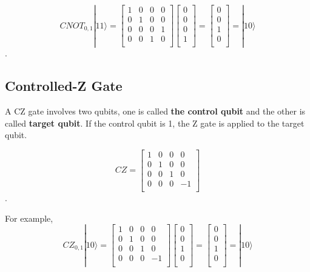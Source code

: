 \begin{equation}
CNOT_{0,1}|11\rangle = 
\begin{bmatrix}
1 & 0 & 0 & 0 \\
0 & 1 & 0 & 0 \\
0 & 0 & 0 & 1 \\
0 & 0 & 1 & 0 \\
\end{bmatrix}
 \left[
\begin{array}{c}
0 \\
0 \\
0 \\
1 \\
\end{array}
\right]
=  \left[
\begin{array}{c}
0 \\
0 \\
1 \\
0 \\
\end{array}
\right] 
= |10\rangle 
\end{equation}.

\subsection{Controlled-Z Gate}
A CZ gate involves two qubits, one is called \textbf{the control qubit} and the other is called \textbf{target qubit}.  If the control qubit is 1, the Z gate is applied to the target qubit.

\begin{equation}
CZ = \begin{bmatrix}
1 & 0 & 0 & 0 \\
0 & 1 & 0 & 0 \\
0 & 0 & 1 & 0 \\
0 & 0 & 0 & -1 \\
\end{bmatrix}
\end{equation}.

For example,
\begin{equation}
CZ_{0,1}|10\rangle = 
\begin{bmatrix}
1 & 0 & 0 & 0 \\
0 & 1 & 0 & 0 \\
0 & 0 & 1 & 0 \\
0 & 0 & 0 & -1 \\
\end{bmatrix}
 \left[
\begin{array}{c}
0 \\
0 \\
1 \\
0 \\
\end{array}
\right]
=  \left[
\begin{array}{c}
0 \\
0 \\
1 \\
0 \\
\end{array}
\right] 
= |10\rangle 
\end{equation}

